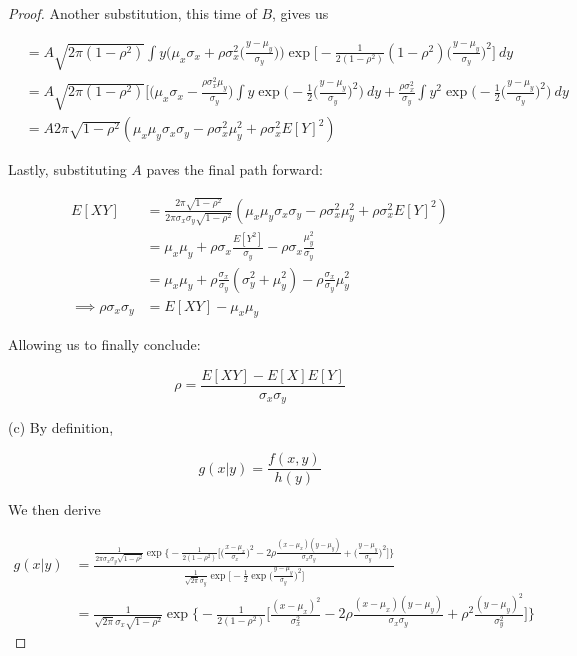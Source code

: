 \documentclass[10pt, oneside]{article}
\begin{document}
\begin{enumerate}[label=9.\arabic*]
\begin{proof}
Another substitution, this time of $B$, gives us

\begin{align*}
&= A \sqrt{2 \pi (1-\rho^2)} \int y \bigg( \mu_x \sigma_x + \rho \sigma^2_x \bigg( \frac{y - \mu_y}{\sigma_y} \bigg) \bigg) \exp \bigg[ -\frac{1}{2(1-\rho^2)} (1-\rho^2) \bigg( \frac{y-\mu_y}{\sigma_y} \bigg)^2 \bigg] \ dy \\
&= A \sqrt{2 \pi (1-\rho^2)} \bigg[ \bigg( \mu_x \sigma_x - \frac{\rho \sigma^2_x \mu_y}{\sigma_y} \bigg) \int y \exp \bigg( -\frac{1}{2} \bigg( \frac{y - \mu_y}{\sigma_y} \bigg)^2 \bigg) \ dy + \frac{\rho \sigma^2_x}{\sigma_y} \int y^2 \exp \bigg( -\frac{1}{2} \bigg( \frac{y - \mu_y}{\sigma_y} \bigg)^2 \bigg) \ dy \\
&= A 2 \pi \sqrt{1-\rho^2} (\mu_x \mu_y \sigma_x \sigma_y  - \rho \sigma^2_x \mu^2_y + \rho \sigma^2_x E[Y]^2 )
\end{align*}

Lastly, substituting $A$ paves the final path forward:

\begin{align*}
E[XY] &= \frac{2\pi \sqrt{1-\rho^2}}{2\pi \sigma_x \sigma_y \sqrt{1-\rho^2}} (\mu_x \mu_y \sigma_x \sigma_y  - \rho \sigma^2_x \mu^2_y + \rho \sigma^2_x E[Y]^2 ) \\
&= \mu_x \mu_y + \rho \sigma_x \frac{E[Y^2]}{\sigma_y} - \rho \sigma_x \frac{\mu^2_y}{\sigma_y} \\
&= \mu_x \mu_y + \rho \frac{\sigma_x}{\sigma_y} (\sigma^2_y + \mu^2_y) - \rho \frac{\sigma_x}{\sigma_y} \mu^2_y \\
\implies \rho \sigma_x \sigma_y &= E[XY] - \mu_x \mu_y
\end{align*}

Allowing us to finally conclude:

\[ \boxed{\rho = \frac{E[XY] - E[X] E[Y]}{\sigma_x \sigma_y} } \]

(c) By definition, 

\[ g(x | y) = \frac{f(x,y)}{h(y)} \]

We then derive

\begin{align*}
g(x | y) &= \frac{\frac{1}{2\pi \sigma_x \sigma_y \sqrt{1-\rho^2}} \exp \big\{ -\frac{1}{2(1-\rho^2)} \big[ \big( \frac{x-\mu_x}{\sigma_x} \big)^2 - 2\rho \frac{(x-\mu_x)(y-\mu_y)}{\sigma_x \sigma_y} + \big( \frac{y-\mu_y}{\sigma_y} \big)^2 \big] \big\} }{ \frac{1}{\sqrt{2\pi} \sigma_y} \exp \big[ -\frac{1}{2} \exp \big( \frac{y-\mu_y}{\sigma_y} \big)^2 \big] } \\
&= \frac{1}{\sqrt{2\pi} \sigma_x \sqrt{1-\rho^2}} \exp \bigg\{ -\frac{1}{2(1-\rho^2)} \bigg[ \frac{(x-\mu_x)^2}{\sigma^2_x}  - 2\rho \frac{(x-\mu_x)(y-\mu_y)}{\sigma_x \sigma_y} + \rho^2 \frac{(y - \mu_y)^2}{\sigma^2_y} \bigg] \bigg\}
\end{align*}


\end{proof}
\end{enumerate}
\end{document}
